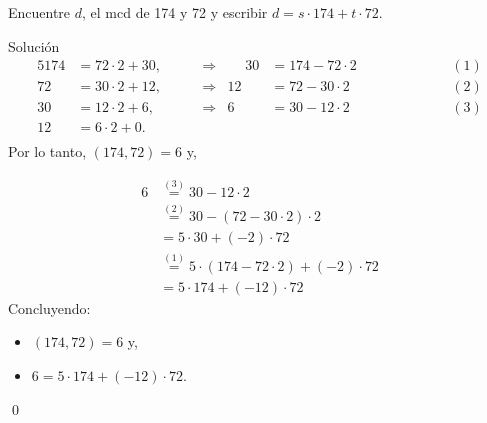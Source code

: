 \documentclass[handout]{beamer} %
\begin{document}
        
    \begin{frame}
        \begin{ejemplo} Encuentre $d$, el mcd de 174 y 72 y  escribir $d = s \cdot 174 + t \cdot 72$.
        \end{ejemplo}\pause
        {\color{blue} Solución}
        \pause 
        \begin{alignat*}5
            174&=72\cdot 2+30,& \;\quad&\Rightarrow&  \;\quad 30 &=     174-72\cdot 2& &\; &\quad\quad\quad&(1)\\
            72&=30\cdot 2+12,& \;&\Rightarrow& 12&=72-30\cdot 2& \; & \; &&(2) \\
            30&=12\cdot 2+6,& \;&\Rightarrow& 6&=    30-12\cdot 2& \; & \; &&(3)\\
            12&=6\cdot 2+0.& \;&&  && &&\\
        \end{alignat*} \pause \vskip -1.0cm
        Por lo tanto,     $(174,72) = 6$ y,
    \end{frame}
    
    
    
    \begin{frame}
        \begin{align*}
            6&\stackrel{(3)}{=}    30-12\cdot 2\\
            &\stackrel{(2)}{=}    30-(72-30\cdot 2)\cdot 2 \\  
            &=    5 \cdot 30 + (-2) \cdot 72\\  
            &\stackrel{(1)}{=} 5 \cdot (    174-72\cdot 2) + (-2) \cdot 72\\   
            &=  5\cdot 174+ (-12) \cdot 72  
        \end{align*}
        \pause
        Concluyendo: 
        \begin{itemize}
            \item     $(174,72) = 6$ y,
            \item  $6= 5\cdot 174+ (-12) \cdot 72$.
        \end{itemize}
        \qed
        
        \vskip 2cm
        
    \end{frame}
    
\end{document}
